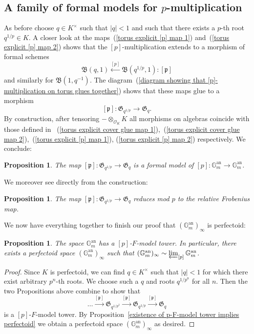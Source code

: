\documentclass[10pt,oneside]{amsart}
\newtheorem{proposition}[theorem]{Proposition}
\theoremstyle{definition}
\theoremstyle{remark}
\begin{document}
	\subsection{A family of formal models for $p$-multiplication}
	As before choose $q\in K^\times$ such that $|q|<1$ and such that there exists a $p$-th root $q^{1/p} \in K$. A closer look at the maps~(\ref{torus explicit [p] map 1}) and~(\ref{torus explicit [p] map 2}) shows that the $[p]$-multiplication extends to a morphism of formal schemes
	\[\mathfrak B(q,1)\xleftarrow{[p]} \mathfrak B(q^{1/p},1):[\mathfrak p]\]
	and similarly for $\mathfrak B(1,q^{-1})$. The diagram~(\ref{diagram showing that [p]-multiplication on torus glues together}) shows that these maps glue to a morphism
	\[[\mathfrak p]: \mathfrak G_{q^{1/p}}\rightarrow  \mathfrak G_q.\]
	By construction, after tensoring $-\otimes_{\mathcal O_K} K$ all morphisms on algebras coincide with those defined in ~(\ref{torus explicit cover glue map 1}),~(\ref{torus explicit cover glue map 2}),~(\ref{torus explicit [p] map 1}), (\ref{torus explicit [p] map 2}) respectively. We conclude:
	\begin{proposition}
		The map $[\mathfrak p]: \mathfrak G_{q^{1/p}}\rightarrow  \mathfrak G_q$ is a formal model of $[p]:\mathbb G_m^{\operatorname{an}}\rightarrow \mathbb G_m^{\operatorname{an}}$.
	\end{proposition}
	We moreover see directly from the construction:
	\begin{proposition}
		The map $[\mathfrak p]: \mathfrak G_{q^{1/p}}\rightarrow  \mathfrak G_q$ reduces mod $p$ to the relative Frobenius map.
	\end{proposition}
	We now have everything together to finish our proof that $(\mathbb G_m^{\operatorname{an}})_\infty$ is perfectoid:
	\begin{proposition}
		The space $\mathbb G_m^{\operatorname{an}}$ has a $[p]$-$F$-model tower. In particular, there exists a perfectoid space $(\mathbb G_m^{\operatorname{an}})_\infty$ such that $(\mathbb G_m^{\operatorname{an}})_\infty \sim \varprojlim_{[p]} \mathbb G_m^{\operatorname{an}}$.
	\end{proposition}
	\begin{proof}
		Since $K$ is perfectoid, we can find $q\in K^\times$ such that $|q|<1$ for which there exist arbitrary $p^n$-th roots. We choose such a $q$ and roots $q^{1/p^n}$ for all $n$. Then the two Propositions above combine to show that 
		\[\dots \xrightarrow{[\mathfrak p]} \mathfrak G_{q^{1/p^2}}\xrightarrow{[\mathfrak p]} \mathfrak G_{q^{1/p}}\xrightarrow{[\mathfrak p]} \mathfrak G_q\]
		is a $[p]$-$F$-model tower.
		By Proposition~\ref{existence of p-F-model tower implies perfectoid} we obtain a perfectoid space $(\mathbb G_m^{\operatorname{an}})_\infty$ as desired.
	\end{proof}
	
\end{document}
